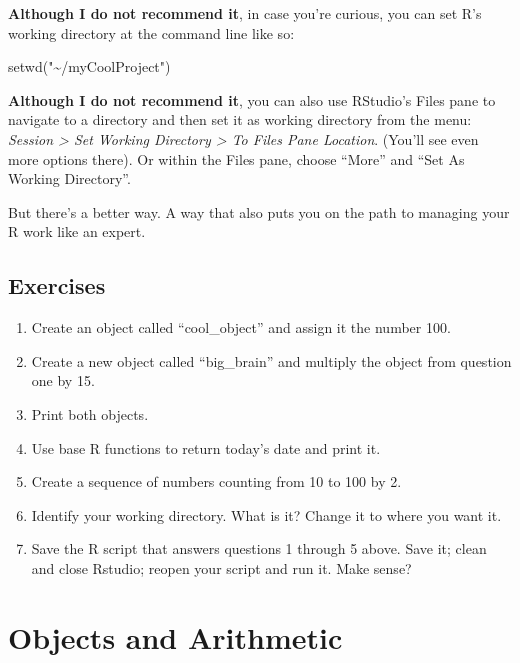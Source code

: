 \documentclass[
]{book}
\newenvironment{Shaded}{\begin{snugshade}}{\end{snugshade}}
\newcommand{\FunctionTok}[1]{\textcolor[rgb]{0.00,0.00,0.00}{#1}}
\newcommand{\NormalTok}[1]{#1}
\newcommand{\StringTok}[1]{\textcolor[rgb]{0.31,0.60,0.02}{#1}}
\begin{document}
\textbf{Although I do not recommend it}, in case you're curious, you can set R's working directory at the command line like so:

\begin{Shaded}
\begin{Highlighting}[]
\FunctionTok{setwd}\NormalTok{(}\StringTok{"\textasciitilde{}/myCoolProject"}\NormalTok{)}
\end{Highlighting}
\end{Shaded}

\textbf{Although I do not recommend it}, you can also use RStudio's Files pane to navigate to a directory and then set it as working directory from the menu: \emph{Session \textgreater{} Set Working Directory \textgreater{} To Files Pane Location}. (You'll see even more options there). Or within the Files pane, choose ``More'' and ``Set As Working Directory''.

But there's a better way. A way that also puts you on the path to managing your R work like an expert.

\hypertarget{exercises}{%
\section{Exercises}\label{exercises}}

\begin{enumerate}
\def\labelenumi{\arabic{enumi}.}
\item
  Create an object called ``cool\_object'' and assign it the number 100.
\item
  Create a new object called ``big\_brain'' and multiply the object from question one by 15.
\item
  Print both objects.
\item
  Use base R functions to return today's date and print it.
\item
  Create a sequence of numbers counting from 10 to 100 by 2.
\item
  Identify your working directory. What is it? Change it to where you want it.
\item
  Save the R script that answers questions 1 through 5 above. Save it; clean and close Rstudio; reopen your script and run it. Make sense?
\end{enumerate}

\hypertarget{objects-and-arithmetic}{%
\chapter{Objects and Arithmetic}\label{objects-and-arithmetic}}
\end{document}

